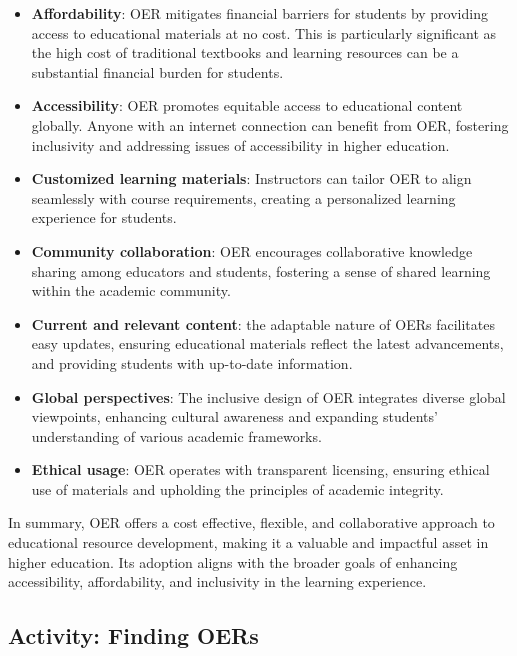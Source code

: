 \documentclass[
  letterpaper,
  DIV=11,
  numbers=noendperiod]{scrreprt}
\providecommand{\tightlist}{%
  \setlength{\itemsep}{0pt}\setlength{\parskip}{0pt}}\usepackage{longtable,booktabs,array}
\begin{document}
\begin{itemize}
\tightlist
\item
  \textbf{Affordability}: OER mitigates financial barriers for students
  by providing access to educational materials at no cost. This is
  particularly significant as the high cost of traditional textbooks and
  learning resources can be a substantial financial burden for students.
\item
  \textbf{Accessibility}: OER promotes equitable access to educational
  content globally. Anyone with an internet connection can benefit from
  OER, fostering inclusivity and addressing issues of accessibility in
  higher education.
\item
  \textbf{Customized learning materials}: Instructors can tailor OER to
  align seamlessly with course requirements, creating a personalized
  learning experience for students.
\item
  \textbf{Community collaboration}: OER encourages collaborative
  knowledge sharing among educators and students, fostering a sense of
  shared learning within the academic community.
\item
  \textbf{Current and relevant content}: the adaptable nature of OERs
  facilitates easy updates, ensuring educational materials reflect the
  latest advancements, and providing students with up-to-date
  information.
\item
  \textbf{Global perspectives}: The inclusive design of OER integrates
  diverse global viewpoints, enhancing cultural awareness and expanding
  students' understanding of various academic frameworks.
\item
  \textbf{Ethical usage}: OER operates with transparent licensing,
  ensuring ethical use of materials and upholding the principles of
  academic integrity.
\end{itemize}

In summary, OER offers a cost effective, flexible, and collaborative
approach to educational resource development, making it a valuable and
impactful asset in higher education. Its adoption aligns with the
broader goals of enhancing accessibility, affordability, and inclusivity
in the learning experience.

\subsection{Activity: Finding OERs}\label{activity-finding-oers}
\end{document}
